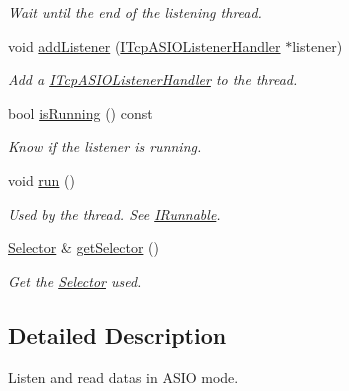 \begin{DoxyCompactItemize}
\begin{DoxyCompactList}\small\item\em Wait until the end of the listening thread. \end{DoxyCompactList}\item 
void \hyperlink{classmognetwork_1_1_tcp_a_s_i_o_listener_a0d0b24852fdd94ad5096a87a40bc7712}{add\-Listener} (\hyperlink{classmognetwork_1_1_i_tcp_a_s_i_o_listener_handler}{I\-Tcp\-A\-S\-I\-O\-Listener\-Handler} $\ast$listener)
\begin{DoxyCompactList}\small\item\em Add a \hyperlink{classmognetwork_1_1_i_tcp_a_s_i_o_listener_handler}{I\-Tcp\-A\-S\-I\-O\-Listener\-Handler} to the thread. \end{DoxyCompactList}\item 
bool \hyperlink{classmognetwork_1_1_tcp_a_s_i_o_listener_a431eb0fb3fab8042a9ef0b79d706fffc}{is\-Running} () const 
\begin{DoxyCompactList}\small\item\em Know if the listener is running. \end{DoxyCompactList}\item 
\hypertarget{classmognetwork_1_1_tcp_a_s_i_o_listener_a445dcd4bf6dfe75c7715af0fecf9494d}{void \hyperlink{classmognetwork_1_1_tcp_a_s_i_o_listener_a445dcd4bf6dfe75c7715af0fecf9494d}{run} ()}\label{classmognetwork_1_1_tcp_a_s_i_o_listener_a445dcd4bf6dfe75c7715af0fecf9494d}

\begin{DoxyCompactList}\small\item\em Used by the thread. See \hyperlink{classmognetwork_1_1_i_runnable}{I\-Runnable}. \end{DoxyCompactList}\item 
\hyperlink{classmognetwork_1_1_selector}{Selector} \& \hyperlink{classmognetwork_1_1_tcp_a_s_i_o_listener_aed4473511088d8bc91ce118334eed24d}{get\-Selector} ()
\begin{DoxyCompactList}\small\item\em Get the \hyperlink{classmognetwork_1_1_selector}{Selector} used. \end{DoxyCompactList}\end{DoxyCompactItemize}


\subsection{Detailed Description}
Listen and read datas in A\-S\-I\-O mode. 

